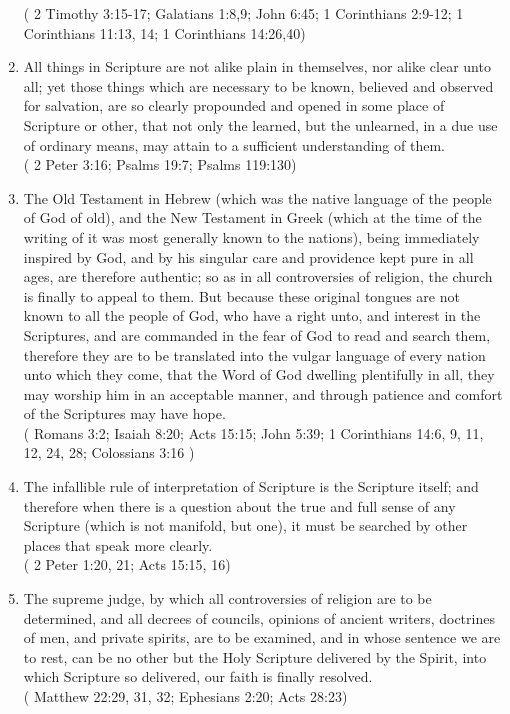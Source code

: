\documentclass[12pt,a4paper]{book}
\begin{document}
\begin{enumerate}
( 2 Timothy 3:15-17; Galatians 1:8,9; John 6:45; 1 Corinthians 2:9-12; 1 Corinthians 11:13, 14; 1 Corinthians 14:26,40)
\item
\label{ch-Scr-7}
All things in Scripture are not alike plain in themselves, nor alike clear unto all; yet those things which are necessary to be known, believed and observed for salvation, are so clearly propounded and opened in some place of Scripture or other, that not only the learned, but the unlearned, in a due use of ordinary means, may attain to a sufficient understanding of them.\\
( 2 Peter 3:16; Psalms 19:7; Psalms 119:130)
\item
\label{ch-Scr-8}
The Old Testament in Hebrew (which was the native language of the people of God of old), and the New Testament in Greek (which at the time of the writing of it was most generally known to the nations), being immediately inspired by God, and by his singular care and providence kept pure in all ages, are therefore authentic; so as in all controversies of religion, the church is finally to appeal to them. But because these original tongues are not known to all the people of God, who have a right unto, and interest in the Scriptures, and are commanded in the fear of God to read and search them, therefore they are to be translated into the vulgar language of every nation unto which they come, that the Word of God dwelling plentifully in all, they may worship him in an acceptable manner, and through patience and comfort of the Scriptures may have hope.\\
( Romans 3:2; Isaiah 8:20; Acts 15:15; John 5:39; 1 Corinthians 14:6, 9, 11, 12, 24, 28; Colossians 3:16 )
\item
\label{ch-Scr-9}
The infallible rule of interpretation of Scripture is the Scripture itself; and therefore when there is a question about the true and full sense of any Scripture (which is not manifold, but one), it must be searched by other places that speak more clearly.\\
( 2 Peter 1:20, 21; Acts 15:15, 16)
\item
\label{ch-Scr-10}
The supreme judge, by which all controversies of religion are to be determined, and all decrees of councils, opinions of ancient writers, doctrines of men, and private spirits, are to be examined, and in whose sentence we are to rest, can be no other but the Holy Scripture delivered by the Spirit, into which Scripture so delivered, our faith is finally resolved.\\
( Matthew 22:29, 31, 32; Ephesians 2:20; Acts 28:23)
\end{enumerate}
\end{document}
